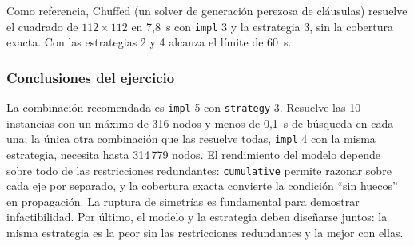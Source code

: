 Como referencia, Chuffed (un solver de generación perezosa de cláusulas) resuelve el cuadrado de $112 \times 112$ en 7,8~s con \texttt{impl} 3 y la estrategia 3, sin la cobertura exacta. Con las estrategias 2 y 4 alcanza el límite de 60~s.

\subsubsection{Conclusiones del ejercicio}

La combinación recomendada es \texttt{impl} 5 con \texttt{strategy} 3. Resuelve las 10 instancias con un máximo de 316 nodos y menos de 0,1~s de búsqueda en cada una; la única otra combinación que las resuelve todas, \texttt{impl} 4 con la misma estrategia, necesita hasta 314\,779 nodos. El rendimiento del modelo depende sobre todo de las restricciones redundantes: \texttt{cumulative} permite razonar sobre cada eje por separado, y la cobertura exacta convierte la condición \enquote{sin huecos} en propagación. La ruptura de simetrías es fundamental para demostrar infactibilidad. Por último, el modelo y la estrategia deben diseñarse juntos: la misma estrategia es la peor sin las restricciones redundantes y la mejor con ellas.

